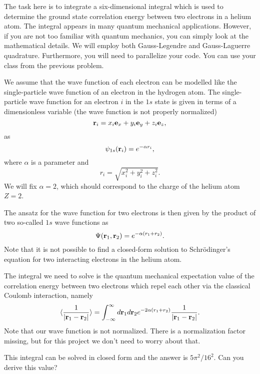 \begin{prob}
The task here is to integrate a six-dimensional integral which is used
to determine the ground state correlation energy between two electrons 
in a helium atom.  
The integral appears in many quantum mechanical applications.
However, if you are not too familiar with quantum mechanics, you can simply look at the mathematical details. 
We will employ both Gauss-Legendre and Gauss-Laguerre 
quadrature.
Furthermore, you will need to parallelize your code. You can use your class 
from the previous problem.


We assume that the wave function of each electron can be modelled like the single-particle
wave function of an electron in the hydrogen atom. The single-particle wave function  for an electron $i$ in the 
$1s$ state 
is given in terms of a dimensionless variable    (the wave function is not properly normalized)
\[
   {\bf r}_i =  x_i {\bf e}_x + y_i {\bf e}_y +z_i {\bf e}_z ,
\]
as
\[
   \psi_{1s}({\bf r}_i)  =   e^{-\alpha r_i},
\]
where $\alpha$ is a parameter and 
\[
r_i = \sqrt{x_i^2+y_i^2+z_i^2}.
\]
We will fix $\alpha=2$, which should correspond to the charge of the helium atom $Z=2$. 

The ansatz for the wave function for two electrons is then given by the product of two 
so-called 
$1s$ wave functions as 
\[
   \Psi({\bf r}_1,{\bf r}_2)  =   e^{-\alpha (r_1+r_2)}.
\]
Note that it is not possible to find a closed-form  solution to Schr\"odinger's equation for 
two interacting electrons in the helium atom. 

The integral we need to solve is the quantum mechanical expectation value of the correlation
energy between two electrons which repel each other via the classical Coulomb interaction, namely
\[
   \langle \frac{1}{|{\bf r}_1-{\bf r}_2|} \rangle =
   \int_{-\infty}^{\infty} d{\bf r}_1d{\bf r}_2  e^{-2\alpha (r_1+r_2)}\frac{1}{|{\bf r}_1-{\bf r}_2|}.
\]
Note that our wave function is not normalized. There is a normalization factor missing, but for this project
we don't need to worry about that.

This integral can be solved in closed form and the answer is $5\pi^2/16^2$. Can you derive this value?


\end{prob}
